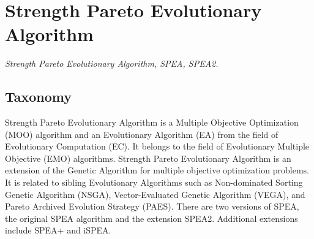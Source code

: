 

\section{Strength Pareto Evolutionary Algorithm} 
\label{sec:spea}

\emph{Strength Pareto Evolutionary Algorithm, SPEA, SPEA2.}

\subsection{Taxonomy}
Strength Pareto Evolutionary Algorithm is a Multiple Objective Optimization (MOO) algorithm and an Evolutionary Algorithm (EA) from the field of Evolutionary Computation (EC). It belongs to the field of Evolutionary Multiple Objective (EMO) algorithms.
Strength Pareto Evolutionary Algorithm is an extension of the Genetic Algorithm for multiple objective optimization problems.
It is related to sibling Evolutionary Algorithms such as Non-dominated Sorting Genetic Algorithm (NSGA), Vector-Evaluated Genetic Algorithm (VEGA), and Pareto Archived Evolution Strategy (PAES).
There are two versions of SPEA, the original SPEA algorithm and the extension SPEA2. Additional extensions include SPEA+ and iSPEA.

